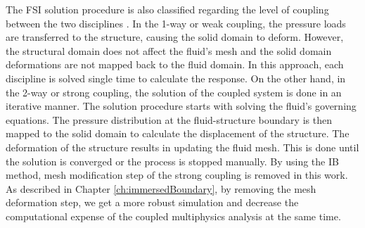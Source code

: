 The FSI solution procedure is also classified regarding the level of coupling between the two disciplines \cite{hu2001direct}. In the 1-way or weak coupling, the pressure loads are transferred to the structure, causing the solid domain to deform. However, the structural domain does not affect the fluid's mesh and the solid domain deformations are not mapped back to the fluid domain. In this approach, each discipline is solved single time to calculate the response. On the other hand, in the 2-way or strong coupling, the solution of the coupled system is done in an iterative manner. The solution procedure starts with solving the fluid's governing equations. The pressure distribution at the fluid-structure boundary is then mapped to the solid domain to calculate the displacement of the structure. The deformation of the structure results in updating the fluid mesh. This is done until the solution is converged or the process is stopped manually. By using the IB method, mesh modification step of the strong coupling is removed in this work. As described in Chapter \ref{ch:immersedBoundary}, by removing the mesh deformation step, we get a more robust simulation and decrease the computational expense of the coupled multiphysics analysis at the same time.
